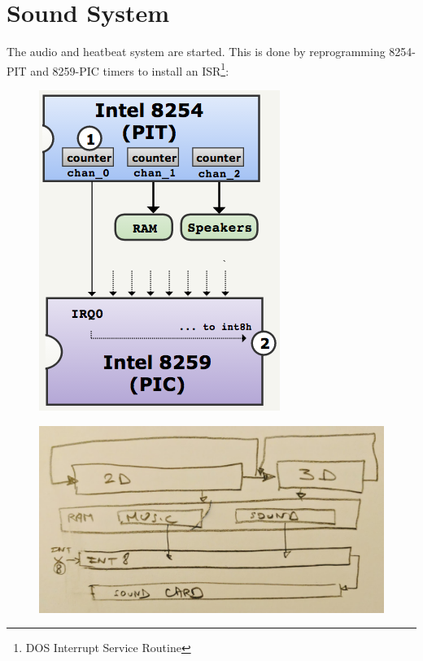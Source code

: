 \section{Sound System}
The audio and heatbeat system are started. This is done by reprogramming 8254-PIT and 8259-PIC timers to install an ISR\footnote{DOS Interrupt Service Routine}:\\
\begin{figure}[H]
\centering
 \includegraphics[width=.5\textwidth]{imgs/heatbeats.png}
 \end{figure}


\begin{figure}[H]
\centering
 \includegraphics[width=\textwidth]{imgs/three_blocks.png}
 \end{figure}

